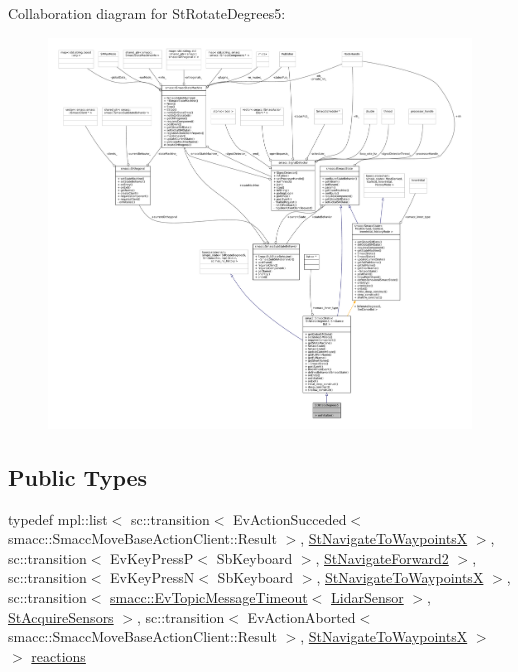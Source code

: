 Collaboration diagram for St\+Rotate\+Degrees5\+:
\nopagebreak
\begin{figure}[H]
\begin{center}
\leavevmode
\includegraphics[width=350pt]{structStRotateDegrees5__coll__graph}
\end{center}
\end{figure}
\subsection*{Public Types}
\begin{DoxyCompactItemize}
\item 
typedef mpl\+::list$<$ sc\+::transition$<$ Ev\+Action\+Succeded$<$ smacc\+::\+Smacc\+Move\+Base\+Action\+Client\+::\+Result $>$, \hyperlink{structStNavigateToWaypointsX}{St\+Navigate\+To\+WaypointsX} $>$, sc\+::transition$<$ Ev\+Key\+PressP$<$ Sb\+Keyboard $>$, \hyperlink{structStNavigateForward2}{St\+Navigate\+Forward2} $>$, sc\+::transition$<$ Ev\+Key\+PressN$<$ Sb\+Keyboard $>$, \hyperlink{structStNavigateToWaypointsX}{St\+Navigate\+To\+WaypointsX} $>$, sc\+::transition$<$ \hyperlink{structsmacc_1_1EvTopicMessageTimeout}{smacc\+::\+Ev\+Topic\+Message\+Timeout}$<$ \hyperlink{sensor__state_8h_a9db9e1944f88de79507758d08e4a2ee3}{Lidar\+Sensor} $>$, \hyperlink{structStAcquireSensors}{St\+Acquire\+Sensors} $>$, sc\+::transition$<$ Ev\+Action\+Aborted$<$ smacc\+::\+Smacc\+Move\+Base\+Action\+Client\+::\+Result $>$, \hyperlink{structStNavigateToWaypointsX}{St\+Navigate\+To\+WaypointsX} $>$ $>$ \hyperlink{structStRotateDegrees5_a21d2794b9a04b90ba2abc2f3e8e3b14d}{reactions}
\end{DoxyCompactItemize}
